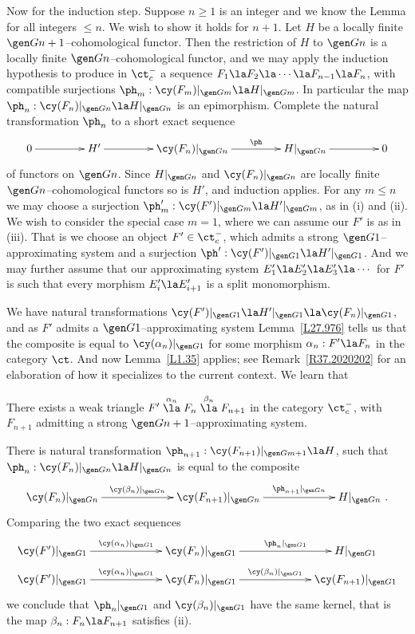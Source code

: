\documentclass[11pt]{amsart}
\begin{document}
Now for the induction step. Suppose $n\geq 1$ is an integer and we know the
Lemma for all integers $\leq n$. We wish to show it holds for $n+1$. Let
$H$ be a locally finite $\gen G{n+1}$--cohomological functor.
Then the restriction of $H$ to $\gen Gn$ is a locally finite
$\gen Gn$--cohomological functor, and we may apply the induction hypothesis
to produce in $\ct^-_c$ a sequence
$F_1\la F_2\la \cdots\la F_{n-1}\la F_n$,
with compatible
surjections $\ph_m:\cy(F_m)|_{\gen Gm}\la H|_{\gen Gm}$.
In particular
the map $\ph_n:\cy(F_n)|_{\gen Gn}\la H|_{\gen Gn}$
is an epimorphism.
Complete the natural transformation $\ph_n$ to a short exact sequence
\[\xymatrix@C+20pt{
  0\ar[r] & H'\ar[r] &\cy(F_n)|_{\gen Gn}\ar[r]^-\ph & H|_{\gen Gn}
  \ar[r] & 0
}\]
of functors on $\gen Gn$. Since $H|_{\gen Gn}$ and $\cy(F_n)|_{\gen Gn}$
are
locally finite $\gen Gn$--cohomological functors so
is $H'$, and induction
applies. For any $m\leq n$ we may choose a surjection
$\ph'_m:\cy(F')|_{\gen Gm}\la H'|_{\gen Gm}$,
as in (i) and (ii). We wish to consider
the special case $m=1$, where we can assume our $F'$ is as in (iii).
That is we choose an object $F'\in\ct^-_c$, which admits a strong
$\gen G1$--approximating system and a surjection
$\ph':\cy(F')|_{\gen G1}\la H'|_{\gen G1}$.
 And
we may further assume that our approximating system
$E'_1\la E'_2\la E'_3\la\cdots$ for $F'$ is such that every morphism
$E'_i\la E'_{i+1}$ is a split monomorphism.

We have natural transformations
$\cy(F')|_{\gen G1}\la H'|_{\gen G1}\la\cy(F_n)|_{\gen G1}$,
and as $F'$ admits a
$\gen G1$--approximating system Lemma~\ref{L27.976} tells
us that the composite
is equal to $\cy(\alpha_n)|_{\gen G1}$ for
some morphism $\alpha_n:F'\la F_n$
in the category $\ct$. And now Lemma~\ref{L1.35} applies;
see Remark~\ref{R37.2020202} for an elaboration of how it specializes
to the current context.
We learn that
\be
\setcounter{enumi}{\value{enumiv}}
\item
  There exists a weak triangle
  $F'\stackrel{\alpha_n}\la F_n\stackrel{\beta_n}\la F_{n+1}$ in
  the category $\ct^-_c$,
with $F_{n+1}$ admitting a strong $\gen G{n+1}$--approximating
system.
\item
  There is natural transformation
  $\ph_{n+1}:\cy(F_{n+1})|_{\gen G{m+1}}\la H$,
  such that $\ph_n:\cy(F_n)|_{\gen G{n}}\la H|_{\gen G{n}}$ is equal to
  the composite
\[\xymatrix@C+40pt{
  \cy(F_n)|_{\gen Gn}\ar[r]^-{\cy(\beta_n)|_{\gen Gn}} & \cy(F_{n+1})|_{\gen Gn} \ar[r]^-{\ph_{n+1}|_{\gen Gn}} &
  H|_{\gen Gn}\ .
}\]
\setcounter{enumiv}{\value{enumi}}
\ee
Comparing the two exact sequences
\[\xymatrix@C+40pt@R-15pt{
  \cy(F')|_{\gen G1}\ar[r]^-{\cy(\alpha_n)|_{\gen G1}} & \cy(F_{n})|_{\gen G1} \ar[r]^-{\ph_{n}|_{\gen G1}} &
  H|_{\gen G1} \\
 \cy(F')|_{\gen G1}\ar[r]^-{\cy(\alpha_n)|_{\gen G1}} & \cy(F_{n})|_{\gen G1} \ar[r]^-{\cy(\beta_{n})|_{\gen G1}} &
  \cy(F_{n+1})|_{\gen G1}
}\]
we conclude that $\ph_{n}|_{\gen G1}$ and $\cy(\beta_{n})|_{\gen G1}$ have
the same kernel, that is
the map $\beta_n:F_n\la F_{n+1}$ satisfies (ii).
\end{document}
